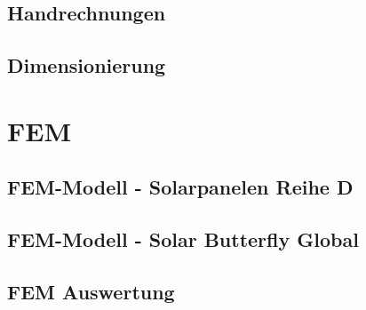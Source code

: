   \subsection{Handrechnungen}
  \label{e:Handrechnungen}
  \subsection{Dimensionierung}
  \label{e:Dimensionierung}

\section{FEM}
  \subsection{FEM-Modell - Solarpanelen Reihe D}
  \label{e:Panelen}
  \subsection{FEM-Modell - Solar Butterfly Global}
  \label{e:Globales FEM}
  \subsection{FEM Auswertung}
  \label{e:FEM Auswertung}
